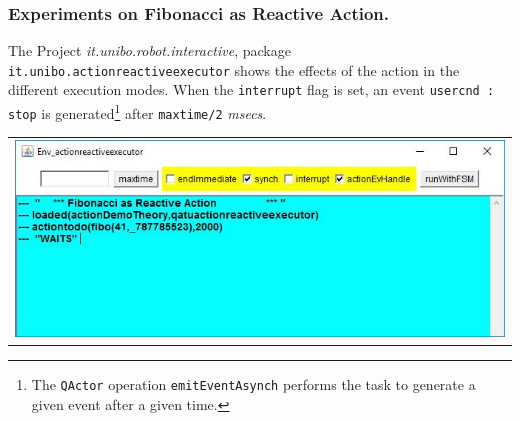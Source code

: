 

\subsubsection{Experiments on Fibonacci as Reactive Action.}

The Project \textit{it.unibo.robot.interactive}, package \texttt{it.unibo.actionreactiveexecutor} shows the effects of the action in the different execution modes. When the \texttt{interrupt} flag is set, an event \texttt{usercnd : stop} is generated\footnote{The \texttt{QActor} operation \texttt{emitEventAsynch} performs the task to generate a given event after a given time.} after \texttt{maxtime/2} \textit{msecs}. 


\begin{center}
\begin{tabular}{ c }
     \includegraphics[scale = 0.6]{img/actionReactive.jpg}\\
\end{tabular} 
\end{center}
